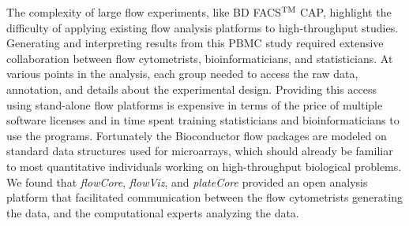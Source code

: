 \documentclass[12pt]{article}
\newcommand{\Rpackage}[1]{{\textit{#1}}}
\def\tm{$^{\rm \text{TM }}$}
\begin{document}
The complexity of large flow experiments, like BD FACS\tm CAP, highlight the 
difficulty of applying existing flow analysis platforms to high-throughput studies. Generating and
interpreting results from this PBMC study required extensive collaboration between flow cytometrists,
bioinformaticians, and statisticians. At various points in the analysis, each group needed to access
the raw data, annotation, and details about the experimental design. Providing this access using
stand-alone flow platforms is expensive in terms of the price of multiple software licenses
and in time spent training statisticians and bioinformaticians to use the programs. 
Fortunately the Bioconductor flow packages are modeled on standard data structures used for 
microarrays, which should already be familiar to most quantitative individuals working on 
high-throughput biological problems. We found that \Rpackage{flowCore}, \Rpackage{flowViz},
and \Rpackage{plateCore} provided an open analysis platform that facilitated communication between
the flow cytometrists generating the data, and the computational experts analyzing the data.


\clearpage

 
\end{document}
